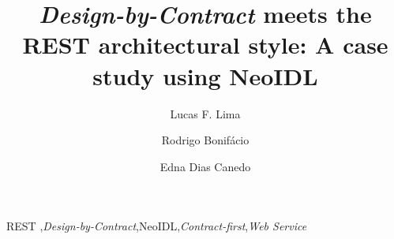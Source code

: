 \documentclass[preprint,12pt,3p]{elsarticle}
\newcommand{\neoidl}{NeoIDL}
\newcommand{\designbycontract}{\textit{Design-by-Contract}}
\newcommand{\ws}{\textit{Web Service}}
\newcommand{\CtFirst}{\textit{Contract-first}}
\begin{document}
\begin{frontmatter}

\title{\designbycontract{} meets the REST architectural style:
A case study using \neoidl{}}


\author[label1,label2]{Lucas F. Lima}
\address[label1]{Brasilia, Brazil, Campus Darci Ribeiro}
\address[label2]{University of Brasilia - UnB}



\author[label5]{Rodrigo Bonifácio}
\address[label5]{University of Brasilia - UnB}

\author[label1,label5]{Edna Dias Canedo}

\begin{abstract}

\end{abstract}

\begin{keyword}
REST \sep \designbycontract \sep \neoidl \sep \CtFirst \sep \ws

\end{keyword}

\end{frontmatter}





 
 


 


 


\end{document}
